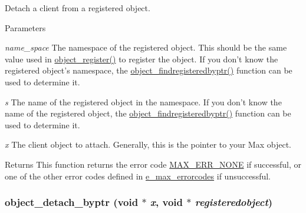 Detach a client from a registered object. 
\begin{DoxyParams}{Parameters}
\item[{\em name\_\-space}]The namespace of the registered object. This should be the same value used in \hyperlink{group__obj_gaaa97beba179d6aebd3f3ede1b5c781fa}{object\_\-register()} to register the object. If you don't know the registered object's namespace, the \hyperlink{group__obj_gadeb570bcae0e9bbf389d571e85d16bfa}{object\_\-findregisteredbyptr()} function can be used to determine it. \item[{\em s}]The name of the registered object in the namespace. If you don't know the name of the registered object, the \hyperlink{group__obj_gadeb570bcae0e9bbf389d571e85d16bfa}{object\_\-findregisteredbyptr()} function can be used to determine it. \item[{\em x}]The client object to attach. Generally, this is the pointer to your Max object.\end{DoxyParams}
\begin{DoxyReturn}{Returns}
This function returns the error code \hyperlink{group__misc_gga0764dd6c02b76cca7d053ae50555d69da6d22f77fef8b1e1b074cef5d29d935fd}{MAX\_\-ERR\_\-NONE} if successful, or one of the other error codes defined in \hyperlink{group__misc_ga0764dd6c02b76cca7d053ae50555d69d}{e\_\-max\_\-errorcodes} if unsuccessful. 
\end{DoxyReturn}
\hypertarget{group__obj_ga9be48cfb39024dc20239079eb60295cd}{
\subsubsection[{object\_\-detach\_\-byptr}]{ object\_\-detach\_\-byptr (void $\ast$ {\em x}, \/  void $\ast$ {\em registeredobject})}}
\label{group__obj_ga9be48cfb39024dc20239079eb60295cd}


